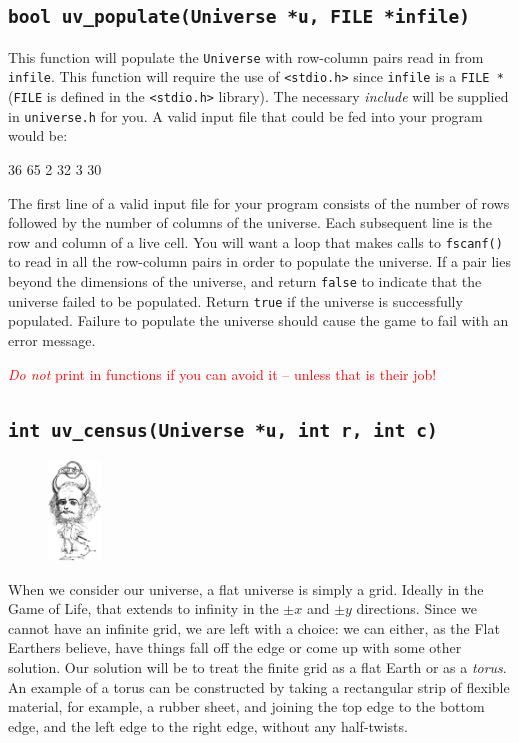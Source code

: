 \documentclass[11pt]{article}
\begin{document}
\subsection{\texttt{bool uv\_populate(Universe *u, FILE *infile)}}

This function will populate the \texttt{Universe} with row-column pairs read in
from \texttt{infile}. This function will require the use of \texttt{<stdio.h>}
since \texttt{infile} is a \texttt{FILE *} (\texttt{FILE} is defined in the
\texttt{<stdio.h>} library). The necessary \emph{include} will be supplied in
\texttt{universe.h} for you. A valid input file that could be fed into your
program would be:

\begin{codelisting}{}
36 65
2 32
3 30
\end{codelisting}

The first line of a valid input file for your program consists of the number of
rows followed by the number of columns of the universe. Each subsequent line
is the row and column of a live cell. You will want a loop that makes calls to
\texttt{fscanf()} to read in all the row-column pairs in order to populate the
universe. If a pair lies beyond the dimensions of the universe, and return \texttt{false} to indicate that the universe failed to
be populated. Return \texttt{true} if the universe is successfully populated. Failure
to populate the universe should cause the game to fail with an error message.

\textcolor{red}{\emph{Do not} print in functions if you can avoid it -- unless that is their job!}


\subsection{\texttt{int uv\_census(Universe *u, int r, int c)}}

\begin{figure}
\includegraphics[width=0.125\textwidth]{images/horns.jpg}
\end{figure}

When we consider our universe, a flat universe is simply a grid.  Ideally
in the Game of Life, that extends to infinity in the $\pm x$ and $\pm y$
directions. Since we cannot have an infinite grid, we are left with a choice: we
can either, as the Flat Earthers believe, have things fall off the edge or come
up with some other solution. Our solution will be to treat the finite grid as a
flat Earth or as a
\emph{torus}. An example of a torus can be constructed by taking a rectangular
strip of flexible material, for example, a rubber sheet, and joining the top
edge to the bottom edge, and the left edge to the right edge, without any
half-twists.
\end{document}
